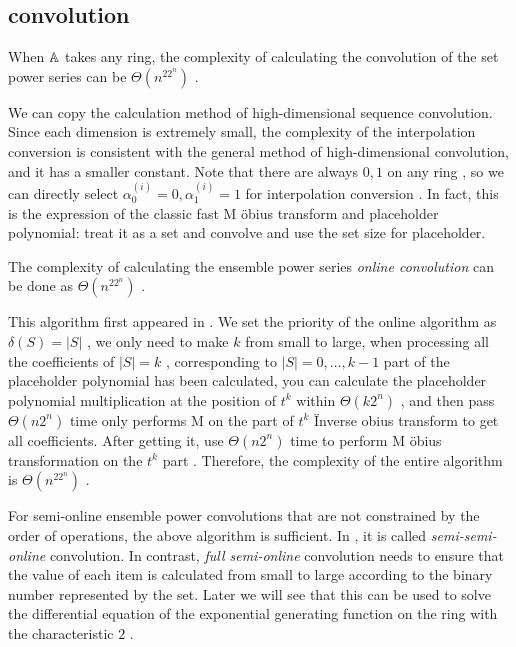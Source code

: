 {\subsection { convolution }

\begin { theorem } \label { cupconv }
When $  \mathbb A $ takes any ring, the complexity of calculating the convolution of the set power series can be $ \Theta (n^ 22 ^n) $ .
\end { theorem }

We can copy the calculation method of high-dimensional sequence convolution. Since each dimension is extremely small, the complexity of the interpolation conversion is consistent with the general method of high-dimensional convolution, and it has a smaller constant. Note that there are always $ 0 , 1 $ on any ring , so we can directly select $ \alpha ^{(i)}_ 0 = 0 , \alpha ^{(i)}_ 1 = 1 $ for interpolation conversion . In fact, this is the expression of the classic fast M \" obius transform and placeholder polynomial: treat it as a set and convolve and use the set size for placeholder.

\begin { theorem }
The complexity of calculating the ensemble power series \emph { online convolution } can be done as $ \Theta (n^ 22 ^n) $ .
\end { theorem }

This algorithm first appeared in \cite { walk }. We set the priority of the online algorithm as $ \delta (S) = |S| $ , we only need to make $ k $ from small to large, when processing all the coefficients of $ |S|=k $ , corresponding to $ |S|= 0 , \dots ,k- 1 $ part of the placeholder polynomial has been calculated, you can calculate the placeholder polynomial multiplication at the position of $ t^k $ within $ \Theta (k 2 ^n) $ , and then pass $ \Theta (n 2 ^n) $ time only performs M on the part of $ t^k $ \"Inverse obius transform to get all coefficients. After getting it, use $ \Theta (n 2 ^n) $ time to perform M \" obius transformation on the $ t^k $ part . Therefore, the complexity of the entire algorithm is $ \Theta (n^ 22 ^n) $ .

For semi-online ensemble power convolutions that are not constrained by the order of operations, the above algorithm is sufficient. In \cite { nimberpoly }, it is called \emph { semi-semi-online } convolution. In contrast, \emph { full semi-online } convolution needs to ensure that the value of each item is calculated from small to large according to the binary number represented by the set. Later we will see that this can be used to solve the differential equation of the exponential generating function on the ring with the characteristic $ 2 $ .

}
